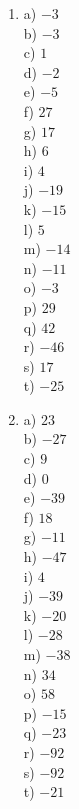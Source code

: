 \documentclass{exam}
\begin{document}
\begin{multicols*}{4}
\begin{enumerate}
\item 	a) $-3$ \\
		b) $-3$ \\
		c) $1$ \\
		d) $-2$ \\
		e) $-5$ \\
		f) $27$ \\
		g) $17$ \\
		h) $6$ \\
		i) $4$ \\
		j) $-19$ \\
		k) $-15$ \\
		l) $5$ \\
		m) $-14$ \\
		n) $-11$ \\
		o) $-3$ \\
		p) $29$ \\
		q) $42$ \\
		r) $-46$ \\
		s) $17$ \\
		t) $-25$ \\


\item 	a) $23$ \\
		b) $-27$ \\
		c) $9$ \\
		d) $0$ \\
		e) $-39$ \\
		f) $18$ \\
		g) $-11$ \\
		h) $-47$ \\
		i) $4$ \\
		j) $-39$ \\
		k) $-20$ \\
		l) $-28$ \\
		m) $-38$ \\
		n) $34$ \\
		o) $58$ \\
		p) $-15$ \\
		q) $-23$ \\
		r) $-92$ \\
		s) $-92$ \\
		t) $-21$ \\



\end{enumerate}
\end{multicols*}
\end{document}
